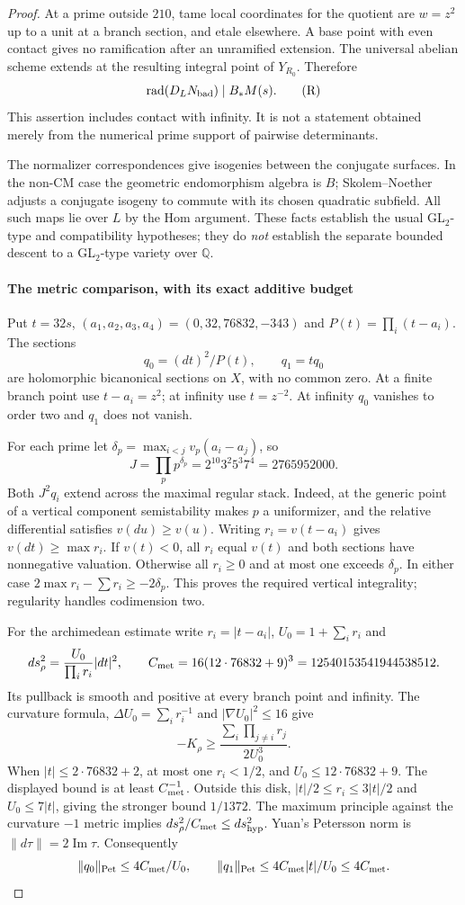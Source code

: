 \begin{proof}
At a prime outside $210$, tame local coordinates for the quotient are
$w=z^2$ up to a unit at a branch section, and etale elsewhere. A base
point with even contact gives no ramification after an unramified
extension. The universal abelian scheme extends at the resulting
integral point of $Y_{R_0}$. Therefore
\[
 \operatorname{rad}(D_LN_{\rm bad})\mid B_*M(s).
\tag{R}\label{eq:h5-R}
\]
This assertion includes contact with infinity. It is not a statement
obtained merely from the numerical prime support of pairwise determinants.

The normalizer correspondences give isogenies between the conjugate
surfaces. In the non-CM case the geometric endomorphism algebra is $B$;
Skolem--Noether adjusts a conjugate isogeny to commute with its chosen
quadratic subfield. All such maps lie over $L$ by the Hom argument.
These facts establish the usual GL$_2$-type and compatibility hypotheses;
they do \emph{not} establish the separate bounded descent to a
GL$_2$-type variety over $\mathbb Q$.

\paragraph{The metric comparison, with its exact additive budget}
Put $t=32s$, $(a_1,a_2,a_3,a_4)=(0,32,76832,-343)$ and
$P(t)=\prod_i(t-a_i)$. The sections
\[
 q_0=(dt)^2/P(t),\qquad q_1=tq_0
\]
are holomorphic bicanonical sections on $X$, with no common zero. At a
finite branch point use $t-a_i=z^2$; at infinity use $t=z^{-2}$.
At infinity $q_0$ vanishes to order two and $q_1$ does not vanish.

For each prime let $\delta_p=\max_{i<j}v_p(a_i-a_j)$, so
\[
 J=\prod_p p^{\delta_p}=2^{10}3^2 5^3 7^4=2765952000.
\]
Both $J^2q_i$ extend across the maximal regular stack. Indeed, at the
generic point of a vertical component semistability makes $p$ a
uniformizer, and the relative differential satisfies $v(du)\ge v(u)$.
Writing $r_i=v(t-a_i)$ gives $v(dt)\ge\max r_i$. If $v(t)<0$, all $r_i$
equal $v(t)$ and both sections have nonnegative valuation. Otherwise all
$r_i\ge0$ and at most one exceeds $\delta_p$. In either case
$2\max r_i-\sum r_i\ge-2\delta_p$. This proves the required vertical
integrality; regularity handles codimension two.

For the archimedean estimate write $r_i=|t-a_i|$, $U_0=1+\sum_i r_i$ and
\[
 ds_\rho^2=\frac{U_0}{\prod_i r_i}|dt|^2,\qquad
 C_{\rm met}=16(12\cdot76832+9)^3=12540153541944538512.
\]
Its pullback is smooth and positive at every branch point and infinity.
The curvature formula, $\Delta U_0=\sum_i r_i^{-1}$ and
$|\nabla U_0|^2\le16$ give
\[
 -K_\rho\ge\frac{\sum_i\prod_{j\ne i}r_j}{2U_0^3}.
\]
When $|t|\le2\cdot76832+2$, at most one $r_i<1/2$, and
$U_0\le12\cdot76832+9$. The displayed bound is at least
$C_{\rm met}^{-1}$. Outside this disk, $|t|/2\le r_i\le3|t|/2$
and $U_0\le7|t|$, giving the stronger bound $1/1372$.
The maximum principle against the curvature $-1$ metric implies
$ds_\rho^2/C_{\rm met}\le ds_{\rm hyp}^2$. Yuan's Petersson norm is
$\|d\tau\|=2\operatorname{Im}\tau$. Consequently
\[
 \|q_0\|_{\rm Pet}\le4C_{\rm met}/U_0,\qquad
 \|q_1\|_{\rm Pet}\le4C_{\rm met}|t|/U_0\le4C_{\rm met}.
\]


\end{proof}

